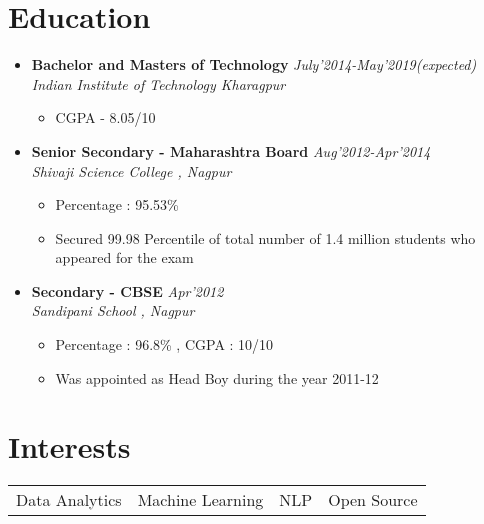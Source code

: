 \documentclass[11pt,a4paper]{moderncv}
\newcommand{\experiencetwo}[4]{
  \vspace{0.1cm}
\item \textbf{\large{#1}} \hfill\textit{#3}\\\textit{#2}
  \begin{itemize}[leftmargin=*]
    \setlength\itemsep{0em} #4
  \end{itemize}
}
\begin{document}
\maketitle
\vspace{-1cm}
\section*{Education}
\begin{itemize}
  \setlength\itemsep{0.5em}

  \experiencetwo{Bachelor and Masters of Technology}{Indian Institute of Technology Kharagpur}{July'2014-May'2019(expected)}{
   \item CGPA - 8.05/10
  }
  
  \experiencetwo{Senior Secondary - Maharashtra Board}{Shivaji Science College , Nagpur}{Aug'2012-Apr'2014}{
  \item Percentage : 95.53\%
  \item Secured 99.98 Percentile of total number of 1.4 million students who appeared for the exam 
  }

  \experiencetwo{Secondary - CBSE}{Sandipani School , Nagpur}{Apr'2012}{
  \item Percentage : 96.8\% , CGPA : 10/10
  \item Was appointed as Head Boy during the year 2011-12
  }
\end{itemize}

\section*{Interests}
\begin{tabular}{L{4cm} L{4cm} L{3.4cm} l}
 Data Analytics & Machine Learning & NLP & Open Source \\
\end{tabular}

\vspace{-0.1cm}
\end{document}
